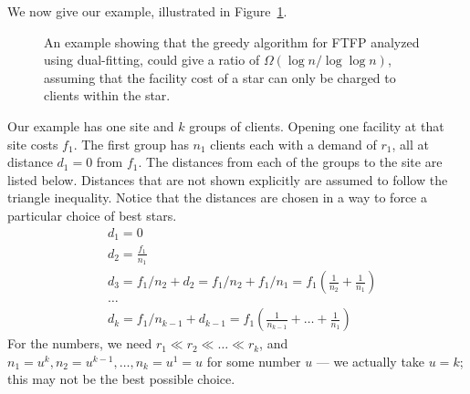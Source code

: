 \documentclass[oneside,final]{ucr}
\def\dsp{\def\baselinestretch{2.0}\large\normalsize}
\def\ssp{\def\baselinestretch{1.0}\large\normalsize}
\begin{document}
We now give our example, illustrated in
Figure~\ref{fig:greedy_lower_bound}.
\ssp
\begin{figure}[ht]
  \centering
  \ssp
  \caption[An $\Omega(\log n / \log\log n)$ example for
  dual-fitting for {\FTFP}]{An example showing that the
    greedy algorithm for FTFP analyzed using dual-fitting,
    could give a ratio of $\Omega(\log n / \log\log n)$,
    assuming that the facility cost of a star can only be
    charged to clients within the star.}
  \dsp
  \label{fig:greedy_lower_bound}
\end{figure}
\dsp
Our example has one site and $k$ groups of clients. Opening
one facility at that site costs $f_1$. The first group has
$n_1$ clients each with a demand of $r_1$, all at distance
$d_1 = 0$ from $f_1$. The distances from each of the groups
to the site are listed below. Distances that are not shown
explicitly are assumed to follow the triangle
inequality. Notice that the distances are chosen in a way to
force a particular choice of best stars.
\begin{align*}
  &d_1 = 0\\
  &d_2 = \frac{f_1}{n_1}\\
  &d_3 = f_1/n_2 + d_2 = f_1/n_2 + f_1/n_1 = f_1 (\frac{1}{n_2} + \frac{1}{n_1})\\
  &\ldots\\
  &d_k = f_1/n_{k-1} + d_{k-1} = f_1 (\frac{1}{n_{k-1}} + \ldots + \frac{1}{n_1})
\end{align*}
For the numbers, we need $r_1 \ll r_2 \ll \ldots \ll r_k$,
and $n_1 = u^k, n_2 = u^{k-1}, \ldots, n_k = u^1 = u$
for some number $u$ --- we actually take $u=k$; this may not
be the best possible choice.
\end{document}
